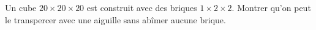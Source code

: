 Un cube $20 \times 20 \times 20$ est construit avec des briques $1 \times 2 \times 2$. Montrer qu'on peut le transpercer avec une aiguille sans abîmer aucune brique.
